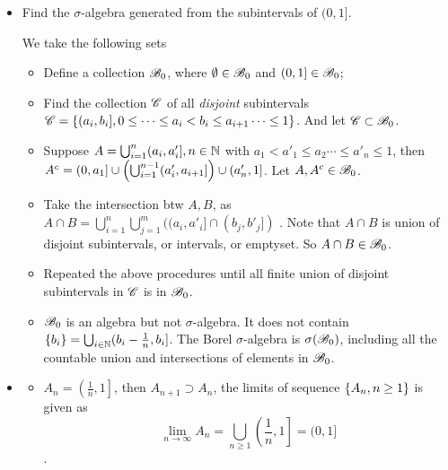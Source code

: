 \documentclass[11pt]{article}
\begin{document}
\begin{itemize}
\item \begin{example}
Find the $\sigma$-algebra generated from the subintervals of $(0,1]$.
\end{example}
\begin{solution}
We take the following sets 
\begin{itemize}
\item Define a collection ${\mathscr B}_{0}$, where $\emptyset \in {\mathscr B}_{0}$ and $(0,1] \in {\mathscr B}_{0}$;
\item Find the collection ${\mathscr C}$ of all \emph{disjoint} subintervals ${\mathscr C} = \left\{ (a_{i}, b_{i}] ,  0\le \cdots \le a_{i} < b_{i} \le a_{i+1} \cdots \le 1\right\}$. And let ${\mathscr C}\subset {\mathscr B}_{0}$.
\item Suppose $A  = \bigcup_{i=1}^{n}(a_{i}, a'_{i}], n\in {\mathbb N}$ with $ a_{1} < a'_{1} \le a_{2} \cdots \le a'_{n}\le 1$, then $A^{c} = (0,a_{1}]\cup \left(\bigcup_{i=1}^{n-1}(a'_{i}, a_{i+1}]\right) \cup (a'_{n}, 1] $. Let $A, A^{c} \in {\mathscr B}_{0}$.

\item Take the intersection btw $A,B$, as $A\cap B = \bigcup_{i=1}^{n}\bigcup_{j=1}^{m}((a_{i}, a'_{i}]\cap (b_{j}, b'_{j}])$ . Note that $A\cap B$ is union of disjoint subintervals, or intervals, or emptyset.  So $A\cap B\in {\mathscr B}_{0}$.
\item Repeated the above procedures until all finite union of disjoint subintervals in ${\mathscr C}$ is in ${\mathscr B}_{0}$.
\item ${\mathscr B}_{0}$ is an algebra but not $\sigma$-algebra. It does not contain $\left\{b_{i}\right\} = \bigcup_{i\in {\mathbb N}}(b_{i}-\frac{1}{n}, b_{i}]$. The Borel $\sigma$-algebra is $\sigma({\mathscr B}_{0})$, including all the countable union and intersections of elements in ${\mathscr B}_{0}$.
\end{itemize}
\end{solution}


\item \begin{example} \citep{resnick2013probability, billingsley2008probability}
\begin{itemize}
\item $A_{n} = \left( \frac{1}{n}, 1 \right]$, then $A_{n+1}\supset A_{n}$, the limits of sequence $\left\{A_{n}, n\ge 1\right\}$ is given as $$ \lim\limits_{n\rightarrow \infty}A_{n} = \bigcup_{n\ge 1}\left( \frac{1}{n}, 1 \right] = (0,1]$$.


\end{itemize}
\end{example}
\end{itemize}
\end{document}
